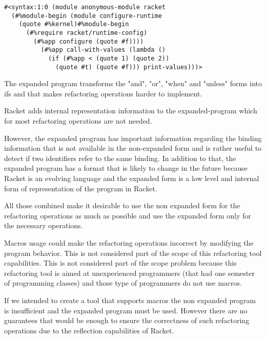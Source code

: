 \begin{lstlisting}[caption="Expanded Syntax from example"]
#<syntax:1:0 (module anonymous-module racket
  (#%module-begin (module configure-runtime
    (quote #%kernel)#%module-begin
      (#%require racket/runtime-config)
        (#%app configure (quote #f))))
          (#%app call-with-values (lambda ()
            (if (#%app < (quote 1) (quote 2))
              (quote #t) (quote #f))) print-values)))>
\end{lstlisting}



The expanded program transforms the "and", "or", "when" and "unless" forms into
ifs and that makes refactoring operations harder to implement.

Racket adds internal representation information to the expanded-program which for
most refactoring operations are not needed.

However, the expanded program has important information regarding the binding
information that is not available in the non-expanded form and is rather useful
to detect if two identifiers refer to the same binding.
In addition to that, the expanded program has a format that is likely to change
in the future because Racket is an evolving language and the expanded form is a
low level and internal form of representation of the program in Racket.

All those combined make it desirable to use the non expanded form for the refactoring
operations as much as possible and use the expanded form only for the necessary
operations.


Macros usage could make the refactoring operations incorrect by modifying the
program behavior. This is not considered part of the scope of this refactoring
tool capabilities.
This is not considered part of the scope problem because this refactoring tool
is aimed at unexperienced programmers (that had one semester of programming classes)
 and those type of programmers do not use macros.

 If we intended to create a tool that supports macros the non expanded program
 is insufficient and the expanded program must be used. However there are no
 guarantees that would be enough to ensure the correctness of such refactoring
 operations due to the reflection capabilities of Racket.

